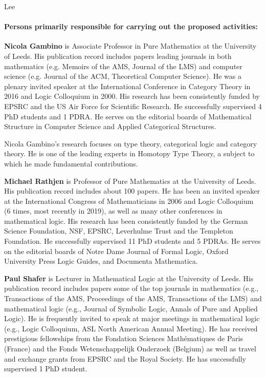 \begin{sitedescription}{Lee}
\paragraph*{Persons primarily responsible for carrying out the proposed activities:}

\begin{compactitem}
\item \textbf{Nicola Gambino} is Associate Professor in Pure Mathematics at the University of Leeds. His publication record includes papers leading journals in both mathematics (e.g. Memoirs of the AMS,  Journal of the LMS) and computer science (e.g. Journal of the ACM, Theoretical Computer Science). He was a plenary invited speaker at the International Conference in Category Theory in 2016 and Logic Colloquium in 2000. His research has been consistently funded by EPSRC and the US Air Force for Scientific Research. He successfully supervised 4 PhD students and 1 PDRA. He serves on the editorial boards of Mathematical Structure in Computer Science and Applied Categorical Structures.

Nicola Gambino's research focuses on type theory, categorical logic and category theory. He is one of the leading experts in Homotopy Type Theory, a subject to which he made fundamental contributions.

\item \textbf{Michael Rathjen} is Professor of Pure Mathematics at the University of Leeds. His publication record includes about 100 papers. He has been an invited speaker at the International Congress of Mathematicians in 2006 and Logic Colloquium (6 times, most recently in 2019), as well as many
other conferences in mathematical logic. His research has been consistently funded by the German Science Foundation, NSF, EPSRC,
Leverhulme Trust and the Templeton Foundation. He successfully supervised 11 PhD students and 5 PDRAs. He serves on the editorial boards of  Notre Dame Journal of Formal Logic, Oxford University Press Logic Guides, and Documenta Mathematica.
\item \textbf{Paul Shafer} is Lecturer in Mathematical Logic at the University of Leeds.  His publication record includes papers some of the top journals in mathematics (e.g., Transactions of the AMS, Proceedings of the AMS, Transactions of the LMS) and mathematical logic (e.g., Journal of Symbolic Logic, Annals of Pure and Applied Logic).  He is frequently invited to speak at major meetings in mathematical logic (e.g., Logic Colloquium, ASL North American Annual Meeting).  He has received prestigious fellowships from the Fondation Sciences Mathématiques de Paris (France) and the Fonds Wetenschappelijk Onderzoek (Belgium) as well as travel and exchange grants from EPSRC and the Royal Society.  He has successfully supervised 1 PhD student.
\end{compactitem}




\end{sitedescription}

